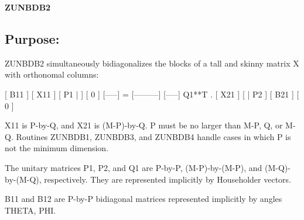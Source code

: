 {\bfseries Z\+U\+N\+B\+D\+B2} 

\subsection*{Purpose\+: }

\begin{DoxyVerb} ZUNBDB2 simultaneously bidiagonalizes the blocks of a tall and skinny
 matrix X with orthonomal columns:

                            [ B11 ]
      [ X11 ]   [ P1 |    ] [  0  ]
      [-----] = [---------] [-----] Q1**T .
      [ X21 ]   [    | P2 ] [ B21 ]
                            [  0  ]

 X11 is P-by-Q, and X21 is (M-P)-by-Q. P must be no larger than M-P,
 Q, or M-Q. Routines ZUNBDB1, ZUNBDB3, and ZUNBDB4 handle cases in
 which P is not the minimum dimension.

 The unitary matrices P1, P2, and Q1 are P-by-P, (M-P)-by-(M-P),
 and (M-Q)-by-(M-Q), respectively. They are represented implicitly by
 Householder vectors.

 B11 and B12 are P-by-P bidiagonal matrices represented implicitly by
 angles THETA, PHI.\end{DoxyVerb}
 

